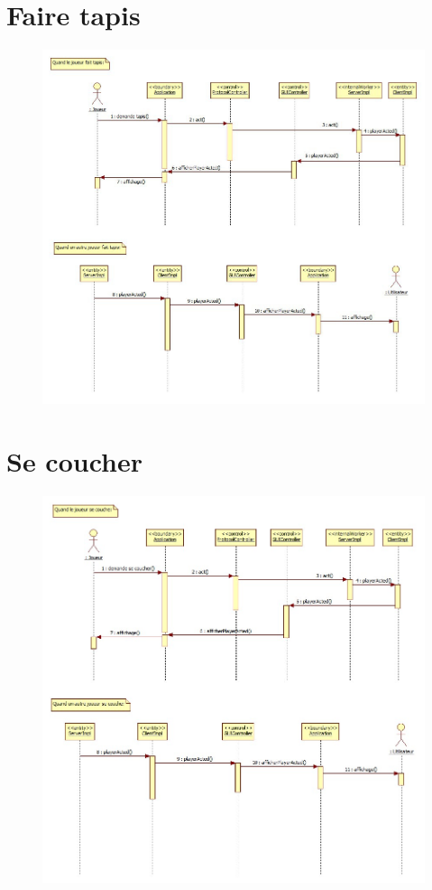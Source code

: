 \section{Faire tapis}
\begin{figure}[ht]
	\centering \includegraphics[angle=90, width=\linewidth]{figures/DetailedAllInSequenceDiagram.jpg}
\end{figure}
\clearpage
\section{Se coucher}
\begin{figure}[ht]
	\centering \includegraphics[angle=90, width=\linewidth]{figures/DetailedFoldSequenceDiagram.jpg}
\end{figure}
\clearpage
